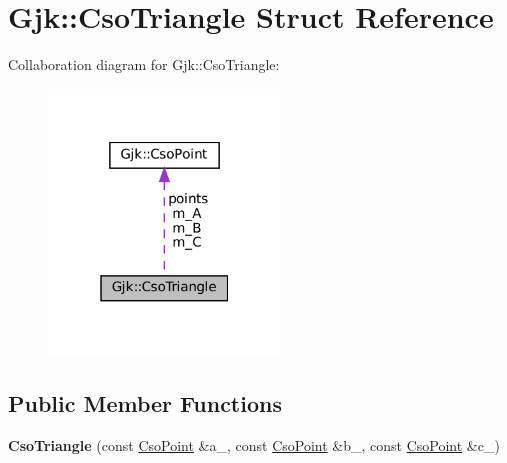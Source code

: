 \hypertarget{structGjk_1_1CsoTriangle}{}\section{Gjk\+:\+:Cso\+Triangle Struct Reference}
\label{structGjk_1_1CsoTriangle}


Collaboration diagram for Gjk\+:\+:Cso\+Triangle\+:\nopagebreak
\begin{figure}[H]
\begin{center}
\leavevmode
\includegraphics[width=175pt]{structGjk_1_1CsoTriangle__coll__graph}
\end{center}
\end{figure}
\subsection*{Public Member Functions}
\begin{DoxyCompactItemize}
\item 
\mbox{\label{structGjk_1_1CsoTriangle_a16bd3105b189e3003fcc9cc27e57e90d}} 
{\bfseries Cso\+Triangle} (const \hyperlink{structGjk_1_1CsoPoint}{Cso\+Point} \&a\+\_\+, const \hyperlink{structGjk_1_1CsoPoint}{Cso\+Point} \&b\+\_\+, const \hyperlink{structGjk_1_1CsoPoint}{Cso\+Point} \&c\+\_\+)
\end{DoxyCompactItemize}
